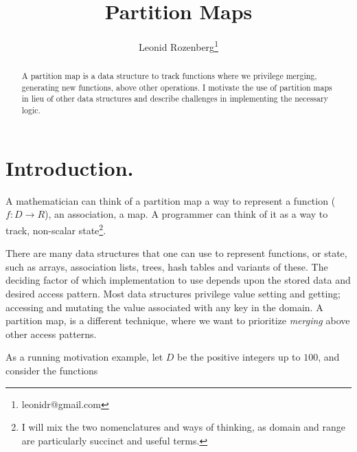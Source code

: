 \documentclass{article}
\begin{document}
\title{Partition Maps}
\author{Leonid Rozenberg\thanks{leonidr@gmail.com}}
\maketitle

\begin{abstract}
  A partition map is a data structure to track functions where we
  privilege merging,
  generating new functions,
  above other operations.
  I motivate the use of partition maps in lieu of other data structures
  and describe challenges in implementing the necessary logic.
\end{abstract}

\section{Introduction.}

A mathematician can think of a partition map a way to represent a function
($f : D \rightarrow R$), an association, a map.
A programmer can think of it as a way to track, non-scalar
state\footnote{I will mix the two nomenclatures and ways of thinking,
as domain and range are particularly succinct and useful terms.}.

There are many data structures that one can use to represent functions,
or state,
such as arrays, association lists, trees, hash tables and variants of these.
The deciding factor of which implementation to use depends upon the stored
data and desired access pattern.
Most data structures privilege value setting and getting;
accessing and mutating the value associated with any key in the domain.
A partition map, is a different technique, where we want to prioritize
\emph{merging} above other access patterns.

As a running motivation example, let $D$ be the positive integers up to $100$,
and consider the functions
\end{document}
